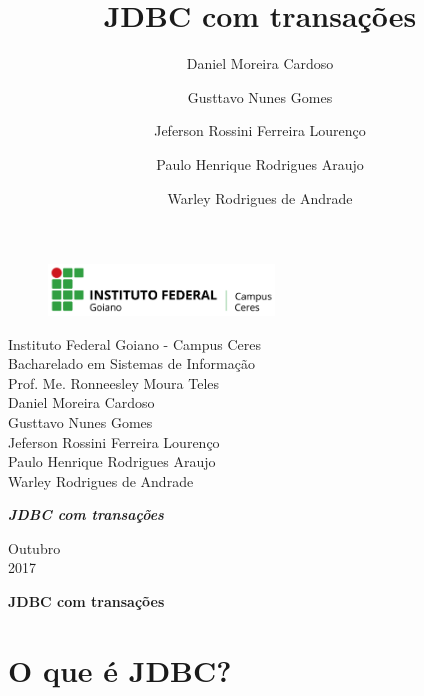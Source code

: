 \documentclass[12pt,a4paper]{article}
\title{JDBC com transações}
\author{Daniel Moreira Cardoso \and Gusttavo Nunes Gomes\and Jeferson Rossini Ferreira Lourenço\and Paulo Henrique Rodrigues Araujo\and Warley Rodrigues de Andrade}
\begin{document}
\begin{titlepage}


\begin{center}
\begin{figure}[htb]
		
		\label{figura:LogoIF}
	
		\centering
		\includegraphics[width=6cm]{recursos/imagens/logo.png} 
\end{figure}


Instituto Federal Goiano - Campus Ceres\\
Bacharelado em Sistemas de Informação\\
Prof. Me. Ronneesley Moura Teles\\\vspace{0.5cm}
Daniel Moreira Cardoso \\
Gusttavo Nunes Gomes\\
Jeferson Rossini Ferreira Lourenço\\
Paulo Henrique Rodrigues Araujo\\
Warley Rodrigues de Andrade\\



\vspace{5.0cm}

\textit{\textbf{\Large{JDBC com transações}}}\\\vspace{0.5cm}
\vspace{9.5cm}

Outubro\\
2017\\
\end{center}
\end{titlepage}



\tableofcontents

\newpage
\begin{center}
\textbf{\Large{JDBC com transações}}\\\vspace{0.5cm}
\end{center}

\section{O que é JDBC? }
\end{document}
